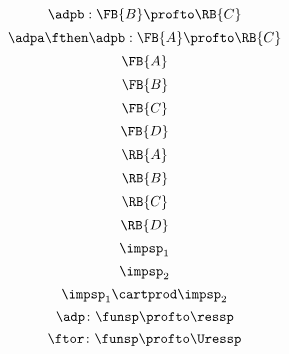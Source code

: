 {\begin{forslides}
\begin{equation}
        \end{equation}
        \begin{equation}
            \label{eq:adp2}
            \adpb: \FB{B} \profto  \RB{C}
        \end{equation}
        \begin{equation}
            \label{eq:adp1adp2}
            \adpa\fthen\adpb: \FB{A} \profto  \RB{C}
        \end{equation}
        \begin{equation}
            \label{eq:FA}
            \FB{A}
        \end{equation}
        \begin{equation}
            \label{eq:FB}
            \FB{B}
        \end{equation}
        \begin{equation}
            \label{eq:FC}
            \FB{C}
        \end{equation}
        \begin{equation}
            \label{eq:FD}
            \FB{D}
        \end{equation}
        \begin{equation}
            \label{eq:RA}
            \RB{A}
        \end{equation}
        \begin{equation}
            \label{eq:RB}
            \RB{B}
        \end{equation}
        \begin{equation}
            \label{eq:RC}
            \RB{C}
        \end{equation}
        \begin{equation}
            \label{eq:RD}
            \RB{D}
        \end{equation}
        \begin{equation}
            \label{eq:impsp1}
            \impsp_1
        \end{equation}
        \begin{equation}
            \label{eq:impsp2}
            \impsp_2
        \end{equation}
        \begin{equation}
            \label{eq:impsp12}
            \impsp_{1} \cartprod \impsp_{2}
        \end{equation}
        \begin{equation}
            \label{eq:dproba}
            \adp \colon \funsp \profto \ressp
        \end{equation}
        \begin{equation}
            \label{eq:dprob2}
            \ftor \colon \funsp \profto \Uressp
        \end{equation}
    \end{forslides}
}

